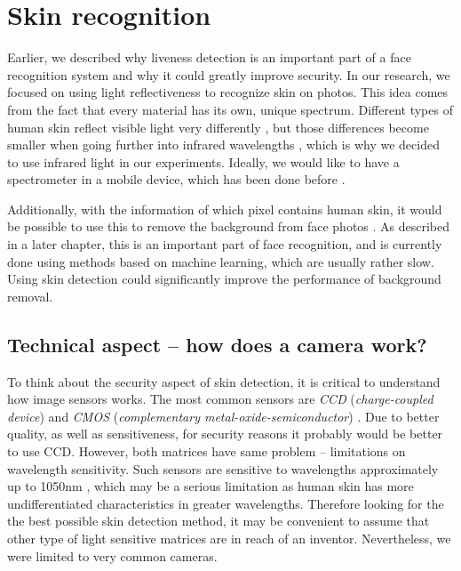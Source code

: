 \chapter{Skin recognition}
    Earlier, we described why liveness detection is an important part
    of a face recognition system and why it could greatly improve security.
    In our research, we focused on using light reflectiveness to recognize skin on photos.
    This idea comes from the fact that every material has its own, unique spectrum.
    Different types of human skin reflect visible light very differently
    \cite{hsreflectance},
    but those differences become smaller when going further into infrared wavelengths
    \cite{visinfra} \cite{toyotaskin}, which is why we decided to use infrared light
    in our experiments.
    Ideally, we would like to have a spectrometer in a mobile device,
    which has been done before \cite{spectrometerphone}.

    Additionally, with the information of which pixel contains human skin,
    it would be possible to use this to remove the background from face
    photos \cite{colorstudy}.
    As described in a later chapter, this is an important part of face recognition,
    and is currently done using methods based on machine learning, which are usually
    rather slow.
    Using skin detection could significantly improve the performance of background
    removal.

    \section{Technical aspect -- how does a camera work?}
        To think about the security aspect of skin detection,
        it is critical to understand how image sensors works.
        The most common sensors are \textit{CCD} (\textit{charge-coupled device})
        and \textit{CMOS} (\textit{complementary metal-oxide-semiconductor}) \cite{mostcommons}.
        Due to better quality, as well as sensitiveness, for security reasons
        it probably would be better to use CCD.
        However, both matrices have same problem -- limitations on wavelength sensitivity.
        Such sensors are sensitive to wavelengths approximately up to 1050nm
        \cite{imagesensorsmax},
        which may be a serious limitation as human skin has more undifferentiated
        characteristics in greater wavelengths.
        Therefore looking for the the best possible skin detection method,
        it may be convenient to assume that other type of light sensitive matrices
        are in reach of an inventor.
        Nevertheless, we were limited to very common cameras.

